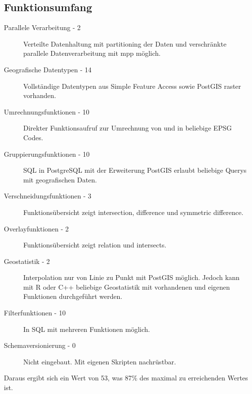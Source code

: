 \subsection{Funktionsumfang}
\begin{description}
\item[Parallele Verarbeitung - 2] Verteilte Datenhaltung mit partitioning der Daten und verschränkte parallele Datenverarbeitung mit \Gls{mpp} möglich. \cite{website:postgresxl-overview}
\item[Geografische Datentypen - 14] Vollständige Datentypen aus Simple Feature Access sowie PostGIS raster vorhanden. \cite{website:postgisdocu-opengis}
\item[Umrechnungsfunktionen - 10] Direkter Funktionsaufruf zur Umrechnung von und in beliebige EPSG Codes. \cite{website:postgis-updatesrid} %
\item[Gruppierungsfunktionen - 10] SQL in PostgreSQL mit der Erweiterung PostGIS erlaubt beliebige Querys mit geografischen Daten. \cite{website:postgisdocu-opengis}
\item[Verschneidungsfunktionen - 3] Funktionsübersicht zeigt intersection, difference und symmetric difference. \cite{website:postgisdocu-functions}
\item[Overlayfunktionen - 2] Funktionsübersicht zeigt relation und intersects. \cite{website:postgisdocu-functions}
\item[Geostatistik - 2] Interpolation nur von Linie zu Punkt mit PostGIS möglich. Jedoch kann mit R oder C++ beliebige Geostatistik mit vorhandenen und eigenen Funktionen durchgeführt werden.
\item[Filterfunktionen - 10] In SQL mit mehreren Funktionen möglich. \cite{website:postgisdocu-functions}
\item[Schemaversionierung - 0] Nicht eingebaut. Mit eigenen Skripten nachrüstbar.
\end{description}
Daraus ergibt sich ein Wert von 53, was 87\% des maximal zu erreichenden Wertes ist.


